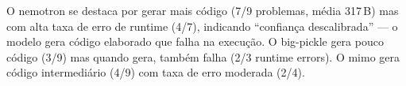 O nemotron se destaca por gerar mais código (7/9 problemas, média 317\,B)
mas com alta taxa de erro de runtime (4/7), indicando ``confiança
descalibrada'' --- o modelo gera código elaborado que falha na execução.
O big-pickle gera pouco código (3/9) mas quando gera, também falha (2/3
runtime errors). O mimo gera código intermediário (4/9) com taxa de erro
moderada (2/4).